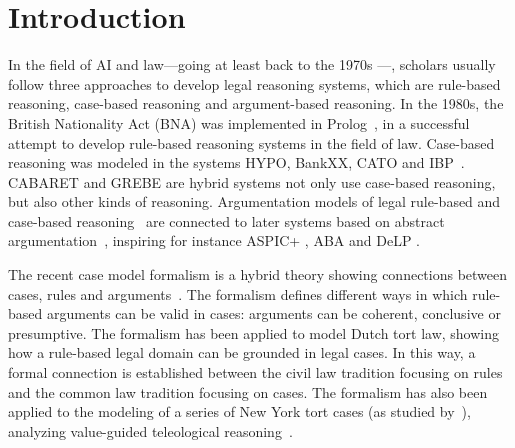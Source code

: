 \documentclass{IOS-Book-Article}
\begin{document}
\section{Introduction}
\noindent 
In the field of AI and law---going at least back to the 1970s \cite{Buchanan1970Some}---, scholars usually follow three approaches to develop legal reasoning systems, which are rule-based reasoning, case-based reasoning and argument-based reasoning. 
In the 1980s, the British Nationality Act (BNA) was implemented in Prolog~\citep{Sergot1986The}, in a successful attempt to develop rule-based reasoning systems in the field of law. Case-based reasoning was modeled in the systems HYPO, BankXX, CATO and IBP~\citep{risslandAshley1987,Ashley1991Reasoning,Rissland1996BankXX,Aleven1997Evaluating,Bruninghaus2003Predicting}. 
CABARET \citep{Rissland1991CABARET} and GREBE \citep{Branting1991Building} are hybrid systems not only use case-based reasoning, but also other kinds of reasoning. 
Argumentation models of legal rule-based and case-based reasoning~\citep{prakkenSartor1996,prakkenSartor1998} are connected to later systems based on abstract argumentation~\citep{Dung1995On}, inspiring for instance ASPIC+ \citep{Prakken2010An}, ABA \citep{Bondarenko1997An} and DeLP \citep{Garcia2003Defeasible}.

The recent case model formalism \citep{Verheij2016Correct} is a hybrid theory showing connections between cases, rules and arguments~\citep{Verheij2017Formalizing}. The formalism defines different ways in which rule-based arguments can be valid in cases: arguments can be coherent, conclusive or presumptive. The formalism has been applied to model Dutch tort law, showing how a rule-based legal domain can be grounded in legal cases. In this way, a formal connection is established between the civil law tradition focusing on rules and the common law tradition focusing on cases. The formalism has also been applied to the modeling of a series of New York tort cases (as studied by~\cite{bermanHafner1995,hafnerBerman2002}), analyzing value-guided teleological reasoning~\citep{Verheij2016Formalizing}.
\end{document}
